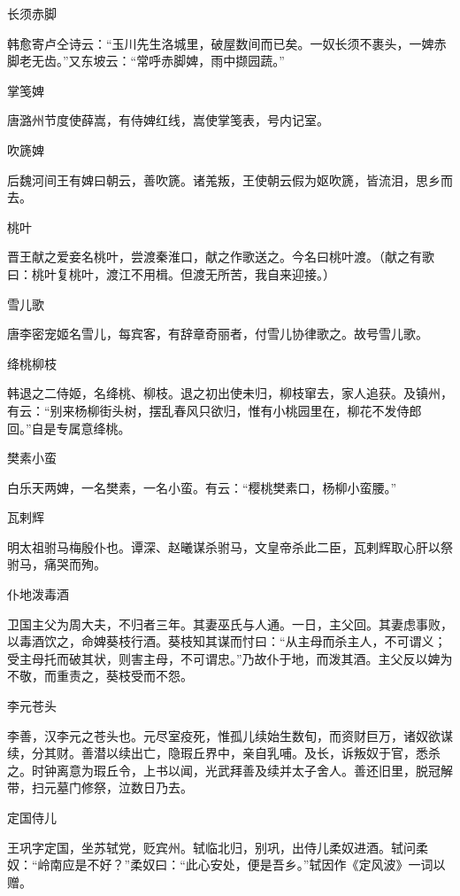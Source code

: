 \documentclass[a4paper,12pt,UTF8,twoside]{ctexbook}
\begin{document}
    长须赤脚
    
    韩愈寄卢仝诗云：“玉川先生洛城里，破屋数间而已矣。一奴长须不裹头，一婢赤脚老无齿。”又东坡云：“常呼赤脚婢，雨中撷园蔬。”
    
    掌笺婢
    
    唐潞州节度使薛嵩，有侍婢红线，嵩使掌笺表，号内记室。
    
    吹篪婢
    
    后魏河间王有婢曰朝云，善吹篪。诸羗叛，王使朝云假为妪吹篪，皆流泪，思乡而去。
    
    桃叶
    
    晋王献之爱妾名桃叶，尝渡秦淮口，献之作歌送之。今名曰桃叶渡。（献之有歌曰：桃叶复桃叶，渡江不用楫。但渡无所苦，我自来迎接。）
    
    雪儿歌
    
    唐李密宠姬名雪儿，每宾客，有辞章奇丽者，付雪儿协律歌之。故号雪儿歌。
    
    绛桃柳枝
    
    韩退之二侍姬，名绛桃、柳枝。退之初出使未归，柳枝窜去，家人追获。及镇州，有云：“别来杨柳街头树，摆乱春风只欲归，惟有小桃园里在，柳花不发侍郎回。”自是专属意绛桃。
    
    樊素小蛮
    
    白乐天两婢，一名樊素，一名小蛮。有云：“樱桃樊素口，杨柳小蛮腰。”
    
    瓦剌辉
    
    明太祖驸马梅殷仆也。谭深、赵曦谋杀驸马，文皇帝杀此二臣，瓦剌辉取心肝以祭驸马，痛哭而殉。
    
    仆地泼毒酒
    
    卫国主父为周大夫，不归者三年。其妻巫氏与人通。一日，主父回。其妻虑事败，以毒酒饮之，命婢葵枝行酒。葵枝知其谋而忖曰：“从主母而杀主人，不可谓义；受主母托而破其状，则害主母，不可谓忠。”乃故仆于地，而泼其酒。主父反以婢为不敬，而重责之，葵枝受而不怨。
    
    李元苍头
    
    李善，汉李元之苍头也。元尽室疫死，惟孤儿续始生数旬，而资财巨万，诸奴欲谋续，分其财。善潜以续出亡，隐瑕丘界中，亲自乳哺。及长，诉叛奴于官，悉杀之。时钟离意为瑕丘令，上书以闻，光武拜善及续并太子舍人。善还旧里，脱冠解带，扫元墓门修祭，泣数日乃去。
    
    定国侍儿
    
    王巩字定国，坐苏轼党，贬宾州。轼临北归，别巩，出侍儿柔奴进酒。轼问柔奴：“岭南应是不好？”柔奴曰：“此心安处，便是吾乡。”轼因作《定风波》一词以赠。
    
    
    
\end{document}
